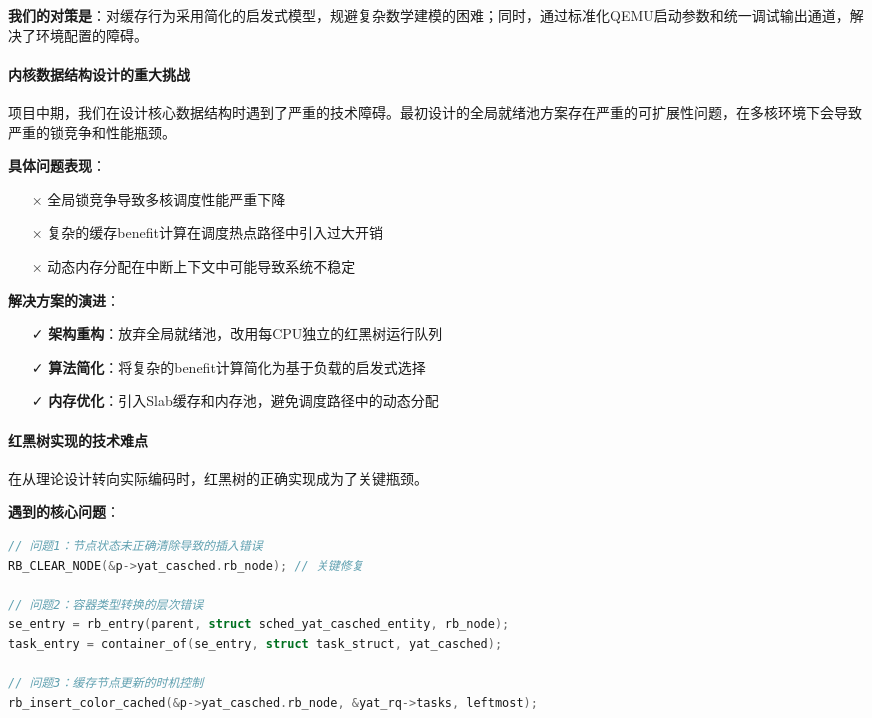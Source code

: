 \textbf{我们的对策是}：对缓存行为采用简化的启发式模型，规避复杂数学建模的困难；同时，通过标准化QEMU启动参数和统一调试输出通道，解决了环境配置的障碍。

\paragraph{内核数据结构设计的重大挑战}

项目中期，我们在设计核心数据结构时遇到了严重的技术障碍。最初设计的全局就绪池方案存在严重的可扩展性问题，在多核环境下会导致严重的锁竞争和性能瓶颈。

\textbf{具体问题表现}：
\begin{itemize}
    \item[×] 全局锁竞争导致多核调度性能严重下降
    \item[×] 复杂的缓存benefit计算在调度热点路径中引入过大开销  
    \item[×] 动态内存分配在中断上下文中可能导致系统不稳定
\end{itemize}

\textbf{解决方案的演进}：
\begin{itemize}
    \item[✓] \textbf{架构重构}：放弃全局就绪池，改用每CPU独立的红黑树运行队列
    \item[✓] \textbf{算法简化}：将复杂的benefit计算简化为基于负载的启发式选择
    \item[✓] \textbf{内存优化}：引入Slab缓存和内存池，避免调度路径中的动态分配
\end{itemize}

\paragraph{红黑树实现的技术难点}

在从理论设计转向实际编码时，红黑树的正确实现成为了关键瓶颈。

\textbf{遇到的核心问题}：
\begin{lstlisting}[language=C, basicstyle=\small\ttfamily]
// 问题1：节点状态未正确清除导致的插入错误
RB_CLEAR_NODE(&p->yat_casched.rb_node); // 关键修复

// 问题2：容器类型转换的层次错误
se_entry = rb_entry(parent, struct sched_yat_casched_entity, rb_node);
task_entry = container_of(se_entry, struct task_struct, yat_casched);

// 问题3：缓存节点更新的时机控制
rb_insert_color_cached(&p->yat_casched.rb_node, &yat_rq->tasks, leftmost);
\end{lstlisting}

